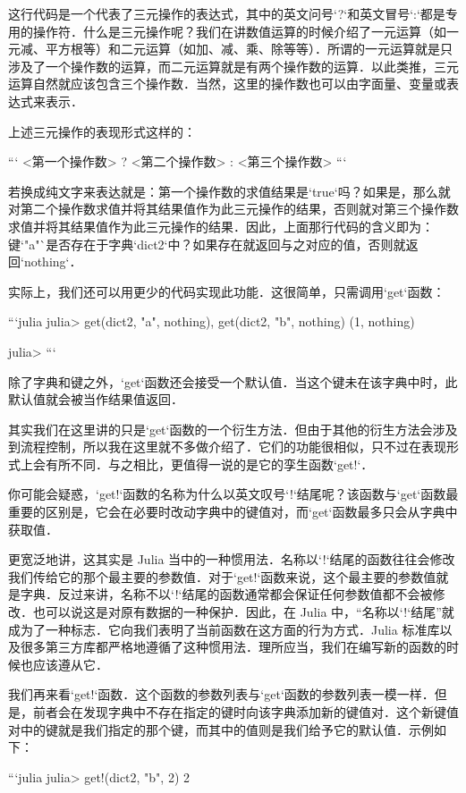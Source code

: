 这行代码是一个代表了三元操作的表达式，其中的英文问号`?`和英文冒号`:`都是专用的操作符．什么是三元操作呢？我们在讲数值运算的时候介绍了一元运算（如一元减、平方根等）和二元运算（如加、减、乘、除等等）．所谓的一元运算就是只涉及了一个操作数的运算，而二元运算就是有两个操作数的运算．以此类推，三元运算自然就应该包含三个操作数．当然，这里的操作数也可以由字面量、变量或表达式来表示．

上述三元操作的表现形式这样的：

```
<第一个操作数> ? <第二个操作数> : <第三个操作数>
```

若换成纯文字来表达就是：第一个操作数的求值结果是`true`吗？如果是，那么就对第二个操作数求值并将其结果值作为此三元操作的结果，否则就对第三个操作数求值并将其结果值作为此三元操作的结果．因此，上面那行代码的含义即为：键`"a"`是否存在于字典`dict2`中？如果存在就返回与之对应的值，否则就返回`nothing`．

实际上，我们还可以用更少的代码实现此功能．这很简单，只需调用`get`函数：

```julia
julia> get(dict2, "a", nothing), get(dict2, "b", nothing)
(1, nothing)

julia> 
```

除了字典和键之外，`get`函数还会接受一个默认值．当这个键未在该字典中时，此默认值就会被当作结果值返回．

其实我们在这里讲的只是`get`函数的一个衍生方法．但由于其他的衍生方法会涉及到流程控制，所以我在这里就不多做介绍了．它们的功能很相似，只不过在表现形式上会有所不同．与之相比，更值得一说的是它的孪生函数`get!`．

你可能会疑惑，`get!`函数的名称为什么以英文叹号`!`结尾呢？该函数与`get`函数最重要的区别是，它会在必要时改动字典中的键值对，而`get`函数最多只会从字典中获取值．

更宽泛地讲，这其实是 Julia 当中的一种惯用法．名称以`!`结尾的函数往往会修改我们传给它的那个最主要的参数值．对于`get!`函数来说，这个最主要的参数值就是字典．反过来讲，名称不以`!`结尾的函数通常都会保证任何参数值都不会被修改．也可以说这是对原有数据的一种保护．因此，在 Julia 中，“名称以`!`结尾”就成为了一种标志．它向我们表明了当前函数在这方面的行为方式．Julia 标准库以及很多第三方库都严格地遵循了这种惯用法．理所应当，我们在编写新的函数的时候也应该遵从它．

我们再来看`get!`函数．这个函数的参数列表与`get`函数的参数列表一模一样．但是，前者会在发现字典中不存在指定的键时向该字典添加新的键值对．这个新键值对中的键就是我们指定的那个键，而其中的值则是我们给予它的默认值．示例如下：

```julia
julia> get!(dict2, "b", 2)
2


